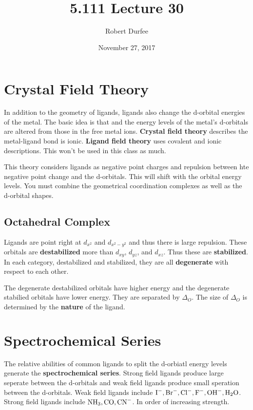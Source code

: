 \documentclass{article}
\title{ 5.111 Lecture 30 }
\author{ Robert Durfee }
\date{ November 27, 2017 }
\begin{document}
\maketitle

\section{ Crystal Field Theory }

In addition to the geometry of ligands, ligands also change the d-orbital
energies of the metal. The basic idea is that and the energy levels of the
metal's d-orbitals are altered from those in the free metal ions.
\textbf{Crystal field theory} describes the metal-ligand bond is ionic.
\textbf{Ligand field theory} uses covalent and ionic descriptions. This won't be
used in this class as much.

This theory considers ligands as negative point charges and repulsion between
hte negative point change and the d-orbitals. This will shift with the orbital
energy levels. You must combine the geometrical coordination complexes as well
as the d-orbital shapes. 

\subsection{ Octahedral Complex }

Ligands are point right at $d_{x^{2}}$ and $d_{x^{2}-y^{2}}$ and thus there is
large repulsion. These orbitals are \textbf{destabilized} more than $d_{xy}$,
$d_{yz}$, and $d_{xz}$. Thus these are \textbf{stabilized}. In each category,
destabilized and stabilized, they are all \textbf{degenerate} with respect to
each other. 

The degenerate destabilized orbitals have higher energy and the degenerate
stabilied orbitals have lower energy. They are separated by $\Delta_{O}$. The
size of $\Delta_{O}$ is determined by the \textbf{nature} of the ligand. 

\section{ Spectrochemical Series }

The relative abilities of common ligands to split the d-orbiatl energy levels
generate the \textbf{spectrochemical series}. Strong field ligands produce large
seperate between the d-orbitals and weak field ligands produce small speration
between the d-orbitals. Weak field ligands include $\ce{ I- }, \ce{ Br- }, \ce{
Cl- }, \ce{ F- }, \ce{ OH- }, \ce{ H_{2}O}$. Strong field ligands include $\ce{
NH_{3} }, \ce{ CO }, \ce{ CN- }$. In order of increasing strength. 
\end{document}
